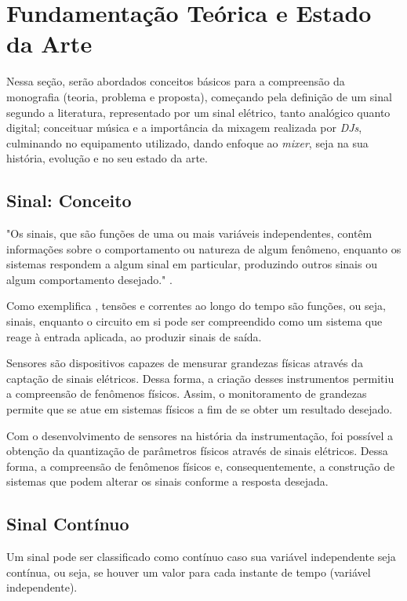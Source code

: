 \chapter[Fundamentação Teórica e Estado da Arte]{Fundamentação Teórica e Estado da Arte}
\label{cha:fundamentacao}
Nessa seção, serão abordados conceitos básicos para a compreensão da monografia (teoria, problema e proposta), começando pela definição de um sinal segundo a literatura, representado por um sinal elétrico, tanto analógico quanto digital; conceituar música e a importância da mixagem realizada por \textit{DJs}, culminando no equipamento utilizado, dando enfoque ao \textit{mixer}, seja na sua história, evolução e no seu estado da arte.

\section{Sinal: Conceito}

\begin{citacao}
"Os sinais, que são funções de uma ou mais variáveis independentes, contêm informações sobre o comportamento ou natureza de algum fenômeno, enquanto os sistemas respondem a algum sinal em particular, produzindo outros sinais ou algum comportamento desejado." \cite{oppenheim2010sinais}.
\end{citacao}

Como exemplifica \cite{oppenheim2010sinais}, tensões e correntes ao longo do tempo são funções, ou seja, sinais, enquanto o circuito em si pode ser compreendido como um sistema que reage à entrada aplicada, ao produzir sinais de saída.

Sensores são dispositivos capazes de mensurar grandezas físicas através da captação de sinais elétricos. Dessa forma, a criação desses instrumentos permitiu a compreensão de fenômenos físicos. Assim, o monitoramento de grandezas permite que se atue em sistemas físicos a fim de se obter um resultado desejado.

Com o desenvolvimento de sensores na história da instrumentação, foi possível a obtenção da quantização de parâmetros físicos através de sinais elétricos. Dessa forma, a compreensão de fenômenos físicos e, consequentemente, a construção de sistemas que podem alterar os sinais conforme a resposta desejada.

\section{Sinal Contínuo}
Um sinal pode ser classificado como contínuo caso sua variável independente seja contínua, ou seja, se houver um valor para cada instante de tempo (variável independente).

